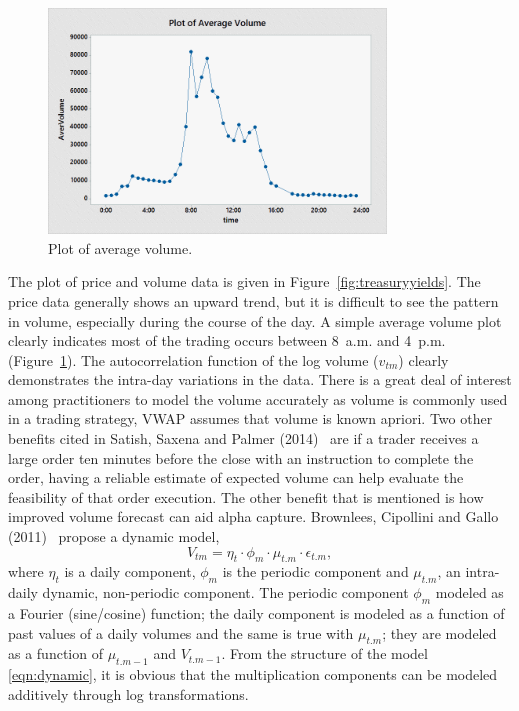         \begin{figure}[!ht]
        \centering
        \includegraphics[width=0.8\textwidth]{chapters/chapter_stat_ts/figures/avgvol.png}
        \caption{Plot of average volume. \label{fig:averagevolume}}
        \end{figure}

The plot of price and volume data is given in Figure~\ref{fig:treasuryyields}. The price data generally shows an upward trend, but it is difficult to see the pattern in volume, especially during the course of the day. A simple average volume plot clearly indicates most of the trading occurs between 8~a.m. and 4~p.m. (Figure~\ref{fig:averagevolume}). The autocorrelation function of the log volume ($v_{tm}$) clearly demonstrates the intra-day variations in the data. There is a great deal of interest among practitioners to model the volume accurately as volume is commonly used in a trading strategy, VWAP assumes that volume is known apriori. Two other benefits cited in Satish, Saxena and Palmer (2014)~\cite{satish} are if a trader receives a large order ten minutes before the close with an instruction to complete the order, having a reliable estimate of expected volume can help evaluate the feasibility of that order execution. The other benefit that is mentioned is how improved volume forecast can aid alpha capture. Brownlees, Cipollini and Gallo (2011)~\cite{brownless} propose a dynamic model,
	\begin{equation} \label{eqn:dynamic}
	V_{tm}= \eta_t \cdot \phi_m \cdot \mu_{t.m} \cdot \epsilon_{t.m},
	\end{equation}
where $\eta_t$ is a daily component, $\phi_m$ is the periodic component and $\mu_{t.m}$, an intra-daily dynamic, non-periodic component. The periodic component $\phi_m$ modeled as a Fourier (sine/cosine) function; the daily component is modeled as a function of past values of a daily volumes and the same is true with $\mu_{t.m}$; they are modeled as a function of $\mu_{t.m-1}$ and $V_{t.m-1}$. From the structure of the model \eqref{eqn:dynamic}, it is obvious that the multiplication components can be modeled additively through log transformations.


